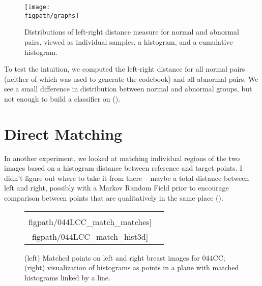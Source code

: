 \begin{figure}[t]
	\centering
		\def\figpath{\figroot/asymmetry}
		\texttt{[image: \\figpath/graphs]}
%
	\caption{Distributions of left-right distance measure for normal and abnormal pairs, viewed as individual samples, a histogram, and a cumulative histogram.}
	\label{f:vq_distances}
\end{figure}

To test the intuition, we computed the left-right distance for all normal pairs (neither of which was used to generate the codebook) and all abnormal pairs. We see a small difference in distribution between normal and abnormal groups, but not enough to build a classifier on ().


\section{Direct Matching}
In another experiment, we looked at matching individual regions of the two images based on a histogram distance between reference and target points. I didn't figure out where to take it from there -- maybe a total distance between left and right, possibly with a Markov Random Field prior to encourage comparison between points that are qualitatively in the same place ().

\begin{figure}[t]
	\centering
	\def\figpath{\figroot/asymmetry}
	\begin{tabular}{c c}
	\begin{minipage}[c]{0.5\columnwidth} 
		\texttt{[image: \\figpath/044LCC\_match\_matches]} 
	\end{minipage}
	\begin{minipage}[c]{0.5\columnwidth}
		\texttt{[image: \\figpath/044LCC\_match\_hist3d]}
	\end{minipage}
	\end{tabular} 
%
	\caption{(left) Matched points on left and right breast images for 044CC; (right) visualization of histograms as points in a plane with matched histograms linked by a line.}
	\label{f:hist_matches}
\end{figure}
